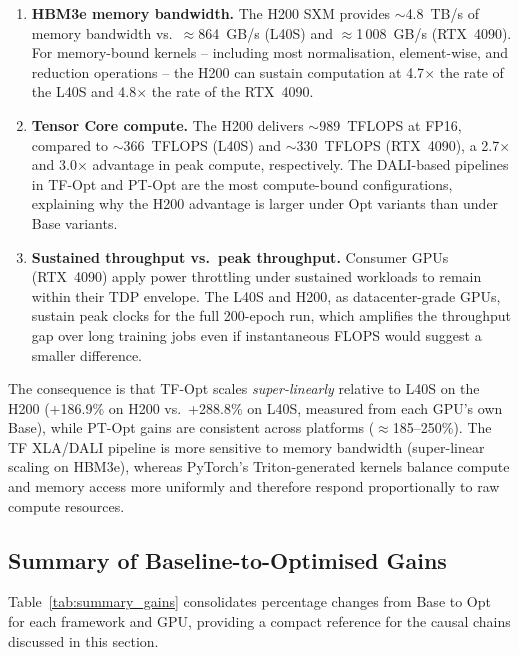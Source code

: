 \begin{enumerate}
  \item \textbf{HBM3e memory bandwidth.}
        The H200 SXM provides ${\sim}$4.8~TB/s of memory bandwidth vs.\
        $\approx$864~GB/s (L40S) and $\approx$1\,008~GB/s (RTX~4090).
        For memory-bound kernels -- including most normalisation,
        element-wise, and reduction operations -- the H200 can sustain
        computation at 4.7$\times$ the rate of the L40S and 4.8$\times$
        the rate of the RTX~4090.

  \item \textbf{Tensor Core compute.}
        The H200 delivers ${\sim}$989~TFLOPS at FP16, compared to
        ${\sim}$366~TFLOPS (L40S) and ${\sim}$330~TFLOPS (RTX~4090), a
        2.7$\times$ and 3.0$\times$ advantage in peak compute,
        respectively.  The DALI-based pipelines in TF-Opt and PT-Opt are
        the most compute-bound configurations, explaining why the H200
        advantage is larger under Opt variants than under Base variants.

  \item \textbf{Sustained throughput vs.\ peak throughput.}
        Consumer GPUs (RTX~4090) apply power throttling under sustained
        workloads to remain within their TDP envelope.  The L40S and
        H200, as datacenter-grade GPUs, sustain peak clocks for the full
        200-epoch run, which amplifies the throughput gap over long
        training jobs even if instantaneous FLOPS would suggest a smaller
        difference.

\end{enumerate}

The consequence is that TF-Opt scales \emph{super-linearly} relative
to L40S on the H200 (+186.9\% on H200 vs.\ +288.8\% on L40S, measured
from each GPU's own Base), while PT-Opt gains are consistent across
platforms (${\approx}$185--250\%).  The TF XLA/DALI pipeline is more
sensitive to memory bandwidth (super-linear scaling on HBM3e), whereas
PyTorch's Triton-generated kernels balance compute and memory access
more uniformly and therefore respond proportionally to raw compute
resources.

\subsection{Summary of Baseline-to-Optimised Gains}
\label{subsec:summary_gains}

Table~\ref{tab:summary_gains} consolidates percentage changes from
Base to Opt for each framework and GPU, providing a compact reference
for the causal chains discussed in this section.

